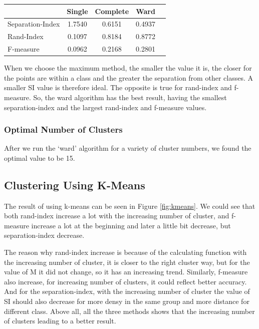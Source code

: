 \documentclass[]{article}
\begin{document}



\begin{tabular}
	{l*{3}{c}r}   	& Single  & Complete & Ward \\ \hline
	Separation-Index& 1.7540 & 0.6151 & 0.4937  \\ 
	Rand-Index & 0.1097 & 0.8184 & 0.8772 \\
	F-measure & 0.0962 & 0.2168 & 0.2801 \\
	

\end{tabular}



When we choose the maximum method, the smaller the value it is, the closer for the points are within a class and the greater the separation from other classes. A smaller SI value is therefore ideal. The opposite is true for rand-index and f-measure. So, the ward algorithm has the best result, having the smallest separation-index and the largest rand-index and f-measure values. 

\subsubsection{Optimal Number of Clusters}

After we run the `ward' algorithm for a variety of cluster numbers, we found the optimal value to be 15.

\subsection{Clustering Using K-Means}

The result of using k-means can be seen in Figure \ref{fig:kmeans}. We could see that both rand-index increase a lot with the increasing number of cluster, and f-measure increase a lot at the beginning and later a little bit decrease, but separation-index decrease.

The reason why rand-index increase is because of the calculating function with the increasing number of cluster, it is closer to the right cluster way, but for the value of M it did not change, so it has an increasing trend. Similarly, f-measure also increase, for increasing number of clusters, it could reflect better accuracy. And for the separation-index, with the increasing number of cluster the value of SI should also decrease for more densy in the same group and more distance for different class. Above all, all the three methods shows that the increasing number of clusters leading to a better result.
\end{document}
